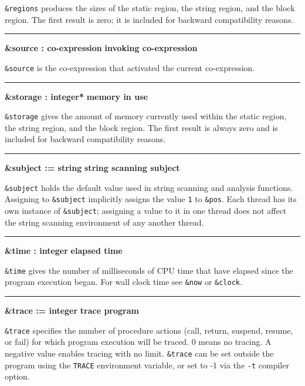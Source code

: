 \noindent
{}\texttt{\&regions} produces the sizes of the static
region, the string region, and the block region. The first result is
zero; it is included for backward compatibility reasons.

\bigskip\hrule\vspace{0.1cm}
\noindent
{\bf \&source : co{}-expression } \hfill {\bf invoking co{}-expression}

\noindent
\texttt{\&source} is the co-expression that activated the current
co-expression.

\bigskip\hrule\vspace{0.1cm}
\noindent
{\bf \&storage : integer* } \hfill {\bf memory in use}

\noindent
{}\texttt{\&storage} gives the amount of memory
currently used within the static region, the string region, and the
block region. The first result is always zero and is included for
backward compatibility reasons.

\bigskip\hrule\vspace{0.1cm}
\noindent
{\bf \&subject := string } \hfill {\bf string scanning subject}

\noindent
{}\texttt{\&subject} holds the default
value used in string scanning and analysis functions. Assigning to
\texttt{\&subject} implicitly assigns the value \texttt{1} to
\texttt{\&pos}.
Each thread has its own instance of 
\texttt{\&subject}; \ConcurrencyIssue assigning a value to it in one
thread does not affect the string scanning environment of any another thread.

\bigskip\hrule\vspace{0.1cm}
\noindent
{\bf \&time : integer } \hfill {\bf elapsed time}

\noindent
{}\texttt{\&}\texttt{time}
gives the number of milliseconds of CPU time that have elapsed since
the program execution began. For wall clock time see \texttt{\&now} or
\texttt{\&clock}.

\bigskip\hrule\vspace{0.1cm}
\noindent
{\bf \&trace := integer } \hfill {\bf trace program}

\noindent
\texttt{\&trace} specifies the number of procedure actions
(call, return, suspend, resume, or fail) for which
program execution will be traced. 0 means no tracing.
A negative value enables tracing with no limit.
\texttt{\&trace} can be set outside the program using the \texttt{TRACE}
environment variable, or set to -1 via
the \texttt{{}-t} compiler option.

